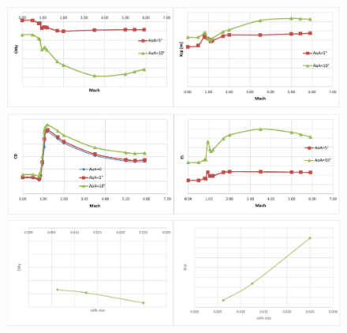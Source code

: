 \documentclass[12pt]{article}
\begin{document}
\begin{figure}[H]
    \centering
    \includegraphics[width=0.95\linewidth]{figs/fig8-vega.png}
    \includegraphics[width=0.95\linewidth]{figs/fig7-vega.png}
    \includegraphics[width=0.95\linewidth]{figs/fig5-vega.png}
    \label{fig:vega-adb}
\end{figure}
\end{document}
